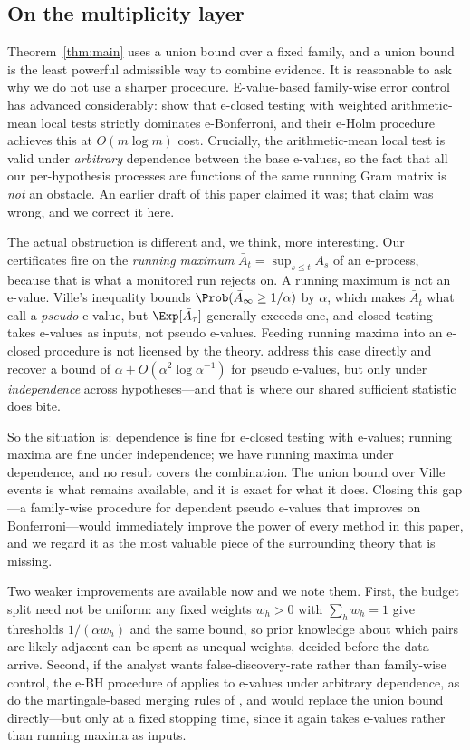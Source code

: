 \subsection{On the multiplicity layer}\label{sec:multiplicity}

Theorem~\ref{thm:main} uses a union bound over a fixed family, and a union
bound is the least powerful admissible way to combine evidence. It is
reasonable to ask why we do not use a sharper procedure. E-value-based
family-wise error control has advanced considerably: \citet{hartog2026fwer}
show that e-closed testing with weighted arithmetic-mean local tests strictly
dominates e-Bonferroni, and their e-Holm procedure achieves this at $O(m \log
m)$ cost. Crucially, the arithmetic-mean local test is valid under
\emph{arbitrary} dependence between the base e-values, so the fact that all
our per-hypothesis processes are functions of the same running Gram matrix is
\emph{not} an obstacle. An earlier draft of this paper claimed it was; that
claim was wrong, and we correct it here.

The actual obstruction is different and, we think, more interesting. Our
certificates fire on the \emph{running maximum} $\bar A_t = \sup_{s \le t}
A_s$ of an e-process, because that is what a monitored run rejects on. A
running maximum is not an e-value. Ville's inequality bounds
$\Prob(\bar A_\infty \ge 1/\alpha)$ by $\alpha$, which makes $\bar A_t$ what
\citet{hartog2026fwer} call a \emph{pseudo} e-value, but $\Exp[\bar A_\tau]$
generally exceeds one, and closed testing takes e-values as inputs, not
pseudo e-values. Feeding running maxima into an e-closed procedure is not
licensed by the theory. \citet{hartog2026fwer} address this case directly and
recover a bound of $\alpha + O(\alpha^2 \log \alpha^{-1})$ for pseudo
e-values, but only under \emph{independence} across hypotheses---and that is
where our shared sufficient statistic does bite.

So the situation is: dependence is fine for e-closed testing with e-values;
running maxima are fine under independence; we have running maxima under
dependence, and no result covers the combination. The union bound over Ville
events is what remains available, and it is exact for what it does. Closing
this gap---a family-wise procedure for dependent pseudo e-values that improves
on Bonferroni---would immediately improve the power of every method in this
paper, and we regard it as the most valuable piece of the surrounding theory
that is missing.

Two weaker improvements are available now and we note them. First, the budget
split need not be uniform: any fixed weights $w_h > 0$ with $\sum_h w_h = 1$
give thresholds $1/(\alpha w_h)$ and the same bound, so prior knowledge about
which pairs are likely adjacent can be spent as unequal weights, decided
before the data arrive. Second, if the analyst wants false-discovery-rate
rather than family-wise control, the e-BH procedure of
\citet{wang2022false} applies to e-values under arbitrary dependence, as do
the martingale-based merging rules of \citet{vovk2024merging}, and would
replace the union bound directly---but only at a fixed stopping time, since it
again takes e-values rather than running maxima as inputs.

